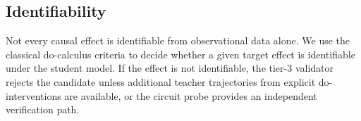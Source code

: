 \subsection{Identifiability}
Not every causal effect is identifiable from observational data alone. We use the classical do-calculus criteria to decide whether a given target effect is identifiable under the student model. If the effect is not identifiable, the tier-3 validator rejects the candidate unless additional teacher trajectories from explicit do-interventions are available, or the circuit probe provides an independent verification path.
